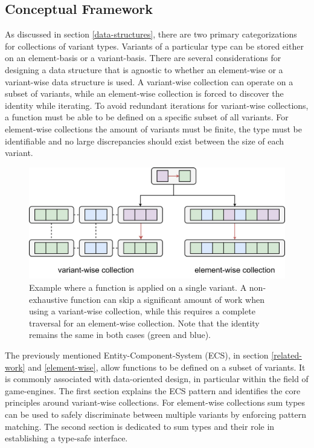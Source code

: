 \documentclass{article}
\begin{document}
\subsection{Conceptual Framework}

As discussed in section \ref{data-structures}, there are two primary categorizations for collections of variant types.
Variants of a particular type can be stored either on an element-basis or a variant-basis.
There are several considerations for designing a data structure that is agnostic to whether an element-wise or a variant-wise data structure is used.
A variant-wise collection can operate on a subset of variants, while an element-wise collection is forced to discover the identity while iterating.
To avoid redundant iterations for variant-wise collections, a function must be able to be defined on a specific subset of all variants.
For element-wise collections the amount of variants must be finite, the type must be identifiable and no large discrepancies should exist between the size of each variant.

\begin{figure}[ht]
    \centering
    \includegraphics[scale=0.06]{ConceptualFramework.png}
    \caption
    {
        Example where a function is applied on a single variant.
        A non-exhaustive function can skip a significant amount of work when using a variant-wise collection, while this requires a complete traversal for an element-wise collection. 
        Note that the identity remains the same in both cases (green and blue).
    }
\end{figure}

The previously mentioned Entity-Component-System (ECS), in section \ref{related-work} and \ref{element-wise}, allow functions to be defined on a subset of variants.
It is commonly associated with data-oriented design, in particular within the field of game-engines.
The first section explains the ECS pattern and identifies the core principles around variant-wise collections.
For element-wise collections sum types can be used to safely discriminate between multiple variants by enforcing pattern matching.
The second section is dedicated to sum types and their role in establishing a type-safe interface.  
\end{document}
